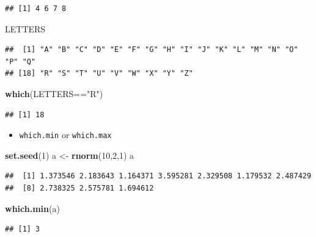 \documentclass[]{article}
\def\tightlist{}
\newenvironment{Shaded}{\begin{snugshade}}{\end{snugshade}}
\newcommand{\KeywordTok}[1]{\textcolor[rgb]{0.13,0.29,0.53}{\textbf{{#1}}}}
\newcommand{\DecValTok}[1]{\textcolor[rgb]{0.00,0.00,0.81}{{#1}}}
\newcommand{\StringTok}[1]{\textcolor[rgb]{0.31,0.60,0.02}{{#1}}}
\newcommand{\NormalTok}[1]{{#1}}
\numberwithin{equation}{section}
\begin{document}
\begin{verbatim}
## [1] 4 6 7 8
\end{verbatim}

\begin{Shaded}
\begin{Highlighting}[]
\NormalTok{LETTERS}
\end{Highlighting}
\end{Shaded}

\begin{verbatim}
##  [1] "A" "B" "C" "D" "E" "F" "G" "H" "I" "J" "K" "L" "M" "N" "O" "P" "Q"
## [18] "R" "S" "T" "U" "V" "W" "X" "Y" "Z"
\end{verbatim}

\begin{Shaded}
\begin{Highlighting}[]
\KeywordTok{which}\NormalTok{(LETTERS==}\StringTok{"R"}\NormalTok{)}
\end{Highlighting}
\end{Shaded}

\begin{verbatim}
## [1] 18
\end{verbatim}

\begin{itemize}
\tightlist
\item
  \texttt{which.min} or \texttt{which.max}
\end{itemize}

\begin{Shaded}
\begin{Highlighting}[]
\KeywordTok{set.seed}\NormalTok{(}\DecValTok{1}\NormalTok{)}
\NormalTok{a <-}\StringTok{ }\KeywordTok{rnorm}\NormalTok{(}\DecValTok{10}\NormalTok{,}\DecValTok{2}\NormalTok{,}\DecValTok{1}\NormalTok{)}
\NormalTok{a}
\end{Highlighting}
\end{Shaded}

\begin{verbatim}
##  [1] 1.373546 2.183643 1.164371 3.595281 2.329508 1.179532 2.487429
##  [8] 2.738325 2.575781 1.694612
\end{verbatim}

\begin{Shaded}
\begin{Highlighting}[]
\KeywordTok{which.min}\NormalTok{(a)}
\end{Highlighting}
\end{Shaded}

\begin{verbatim}
## [1] 3
\end{verbatim}
\end{document}
